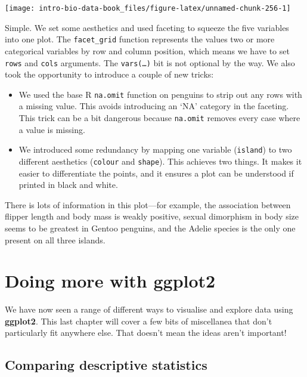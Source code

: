 \documentclass[
]{book}
\providecommand{\tightlist}{%
  \setlength{\itemsep}{0pt}\setlength{\parskip}{0pt}}
\begin{document}
\begin{center}\texttt{[image: intro-bio-data-book\_files/figure-latex/unnamed-chunk-256-1]} \end{center}

Simple. We set some aesthetics and used faceting to squeeze the five variables into one plot. The \texttt{facet\_grid} function represents the values two or more categorical variables by row and column position, which means we have to set \texttt{rows} and \texttt{cols} arguments. The \texttt{vars(\ldots{})} bit is not optional by the way. We also took the opportunity to introduce a couple of new tricks:

\begin{itemize}
\tightlist
\item
  We used the base R \texttt{na.omit} function on penguins to strip out any rows with a missing value. This avoids introducing an `NA' category in the faceting. This trick can be a bit dangerous because \texttt{na.omit} removes every case where a value is missing.
\item
  We introduced some redundancy by mapping one variable (\texttt{island}) to two different aesthetics (\texttt{colour} and \texttt{shape}). This achieves two things. It makes it easier to differentiate the points, and it ensures a plot can be understood if printed in black and white.
\end{itemize}

There is lots of information in this plot---for example, the association between flipper length and body mass is weakly positive, sexual dimorphism in body size seems to be greatest in Gentoo penguins, and the Adelie species is the only one present on all three islands.

\hypertarget{doing-more-with-ggplot2}{%
\chapter{\texorpdfstring{Doing more with \textbf{ggplot2}}{Doing more with ggplot2}}\label{doing-more-with-ggplot2}}

We have now seen a range of different ways to visualise and explore data using \textbf{ggplot2}. This last chapter will cover a few bits of miscellanea that don't particularly fit anywhere else. That doesn't mean the ideas aren't important!

\hypertarget{summaries}{%
\section{Comparing descriptive statistics}\label{summaries}}
\end{document}
